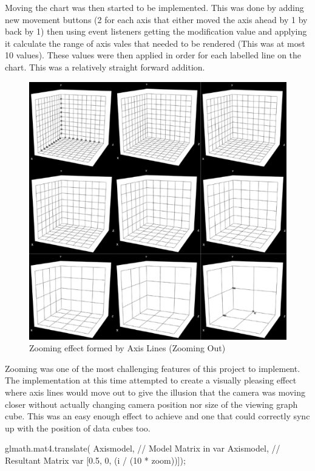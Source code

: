 Moving the chart was then started to be implemented. This was done by adding new movement buttons (2 for each axis that either moved the axis ahead by 1 by back by 1) then using event listeners getting the modification value and applying it calculate the range of axis vales that needed to be rendered (This was at most 10 values). These values were then applied in order for each labelled line on the chart. This was a relatively straight forward addition.
\begin{figure}[h]
    \centering
    \includegraphics[width=1\columnwidth]{author-files/figures/oldzooms.png}
    \caption{Zooming effect formed by Axis Lines (Zooming Out)}
    \label{fig:oldzoom}
\end{figure}

Zooming was one of the most challenging features of this project to implement. The implementation at this time attempted to create a visually pleasing effect where axis lines would move out to give the illusion that the camera was moving closer without actually changing camera position nor size of the viewing graph cube. This was an easy enough effect to achieve and one that could correctly sync up with the position of data cubes too.

\begin{code}
    glmath.mat4.translate(
    Axismodel, // Model Matrix in var
    Axismodel, // Resultant Matrix var
        [0.5, 0, (i / (10 * zoom))]);
\end{code}

